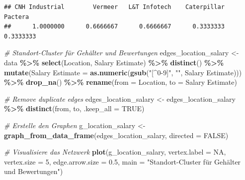 \documentclass[
]{article}
\newenvironment{Shaded}{\begin{snugshade}}{\end{snugshade}}
\newcommand{\AttributeTok}[1]{\textcolor[rgb]{0.13,0.29,0.53}{#1}}
\newcommand{\CommentTok}[1]{\textcolor[rgb]{0.56,0.35,0.01}{\textit{#1}}}
\newcommand{\ConstantTok}[1]{\textcolor[rgb]{0.56,0.35,0.01}{#1}}
\newcommand{\DecValTok}[1]{\textcolor[rgb]{0.00,0.00,0.81}{#1}}
\newcommand{\FloatTok}[1]{\textcolor[rgb]{0.00,0.00,0.81}{#1}}
\newcommand{\FunctionTok}[1]{\textcolor[rgb]{0.13,0.29,0.53}{\textbf{#1}}}
\newcommand{\NormalTok}[1]{#1}
\newcommand{\OtherTok}[1]{\textcolor[rgb]{0.56,0.35,0.01}{#1}}
\newcommand{\SpecialCharTok}[1]{\textcolor[rgb]{0.81,0.36,0.00}{\textbf{#1}}}
\newcommand{\StringTok}[1]{\textcolor[rgb]{0.31,0.60,0.02}{#1}}
\begin{document}
\begin{verbatim}
## CNH Industrial        Vermeer   L&T Infotech    Caterpillar        Pactera 
##      1.0000000      0.6666667      0.6666667      0.3333333      0.3333333
\end{verbatim}

\begin{Shaded}
\begin{Highlighting}[]
\CommentTok{\# Standort{-}Cluster für Gehälter und Bewertungen}
\NormalTok{edges\_location\_salary }\OtherTok{\textless{}{-}}\NormalTok{ data }\SpecialCharTok{\%\textgreater{}\%}
  \FunctionTok{select}\NormalTok{(Location, }\StringTok{\textasciigrave{}}\AttributeTok{Salary Estimate}\StringTok{\textasciigrave{}}\NormalTok{) }\SpecialCharTok{\%\textgreater{}\%}
  \FunctionTok{distinct}\NormalTok{() }\SpecialCharTok{\%\textgreater{}\%}
  \FunctionTok{mutate}\NormalTok{(}\StringTok{\textasciigrave{}}\AttributeTok{Salary Estimate}\StringTok{\textasciigrave{}} \OtherTok{=} \FunctionTok{as.numeric}\NormalTok{(}\FunctionTok{gsub}\NormalTok{(}\StringTok{"[\^{}0{-}9]"}\NormalTok{, }\StringTok{""}\NormalTok{, }\StringTok{\textasciigrave{}}\AttributeTok{Salary Estimate}\StringTok{\textasciigrave{}}\NormalTok{))) }\SpecialCharTok{\%\textgreater{}\%}
  \FunctionTok{drop\_na}\NormalTok{() }\SpecialCharTok{\%\textgreater{}\%}
  \FunctionTok{rename}\NormalTok{(}\AttributeTok{from =}\NormalTok{ Location, }\AttributeTok{to =} \StringTok{\textasciigrave{}}\AttributeTok{Salary Estimate}\StringTok{\textasciigrave{}}\NormalTok{)}

\CommentTok{\# Remove duplicate edges}
\NormalTok{edges\_location\_salary }\OtherTok{\textless{}{-}}\NormalTok{ edges\_location\_salary }\SpecialCharTok{\%\textgreater{}\%}
  \FunctionTok{distinct}\NormalTok{(from, to, }\AttributeTok{.keep\_all =} \ConstantTok{TRUE}\NormalTok{)}

\CommentTok{\# Erstelle den Graphen}
\NormalTok{g\_location\_salary }\OtherTok{\textless{}{-}} \FunctionTok{graph\_from\_data\_frame}\NormalTok{(edges\_location\_salary, }\AttributeTok{directed =} \ConstantTok{FALSE}\NormalTok{)}

\CommentTok{\# Visualisiere das Netzwerk}
\FunctionTok{plot}\NormalTok{(g\_location\_salary, }\AttributeTok{vertex.label =} \ConstantTok{NA}\NormalTok{, }\AttributeTok{vertex.size =} \DecValTok{5}\NormalTok{, }
     \AttributeTok{edge.arrow.size =} \FloatTok{0.5}\NormalTok{, }\AttributeTok{main =} \StringTok{"Standort{-}Cluster für Gehälter und Bewertungen"}\NormalTok{)}
\end{Highlighting}
\end{Shaded}
\end{document}
